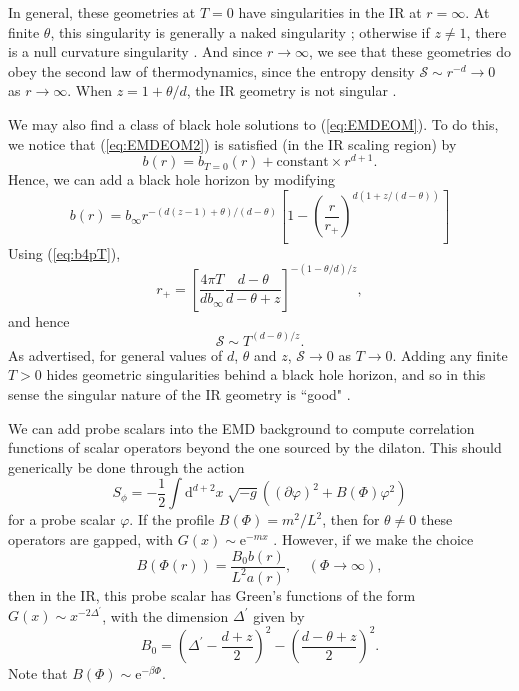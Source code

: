 \documentclass[10pt, oneside]{book}
\begin{document}
\begin{doublespace}
In general,  these geometries at $T=0$ have singularities in the IR at $r=\infty$.   At finite $\theta$, this singularity is generally a naked singularity \cite{Shaghoulian:2011aa};  otherwise if $z\ne 1$, there is a null curvature singularity \cite{Horowitz:2011gh}.    And since $r\rightarrow \infty$, we see that these geometries do obey the second law of thermodynamics, since the entropy density $\mathcal{S} \sim r^{-d}\rightarrow 0$ as $r\rightarrow\infty$.   When $z=1+\theta/d$, the IR geometry is not singular \cite{Shaghoulian:2011aa}.

We may also find a class of black hole solutions to (\ref{eq:EMDEOM}).   To do this, we notice that (\ref{eq:EMDEOM2}) is satisfied (in the IR scaling region) by \begin{equation}
b(r) = b_{T=0}(r) + \text{constant}\times r^{d+1}.
\end{equation}
Hence, we can add a black hole horizon by modifying \begin{equation}
b(r) = b_\infty r^{-(d(z-1)+\theta)/(d-\theta)} \left[1 - \left(\frac{r}{r_+}\right)^{d(1+z/(d-\theta))}\right]
\end{equation}
Using (\ref{eq:b4pT}),  \begin{equation}
r_+ = \left[\frac{4\pi T}{db_\infty} \frac{d-\theta}{d-\theta+z}\right]^{-(1-\theta/d)/z},  \label{eq:rPEMD}
\end{equation}
and hence \begin{equation}
\mathcal{S} \sim T^{(d-\theta)/z}.  \label{eq:Sthetaz}
\end{equation}
As advertised, for general values of $d$, $\theta$ and $z$, $\mathcal{S} \rightarrow 0$ as $T\rightarrow 0$.  Adding any finite $T>0$ hides geometric singularities behind a black hole horizon, and so in this sense the singular nature of the IR geometry is ``good" \cite{Gubser:2000nd}.   

We can add probe scalars into the EMD background to compute correlation functions of scalar operators beyond the one sourced by the dilaton.  This should generically be done through the action  \begin{equation}
S_\phi = -\frac{1}{2}\int \mathrm{d}^{d+2}x\; \sqrt{-g}\left((\partial \varphi)^2 + B(\Phi)\varphi^2\right)  \label{eq:4phi}
\end{equation}
for a probe scalar $\varphi$.   If the profile $B(\Phi) = m^2/L^2$,  then for $\theta \ne 0$ these operators are gapped, with $G(x)\sim \mathrm{e}^{-mx}$ \cite{Dong:2012se}.    However, if we make the choice \cite{lucas1401} \begin{equation}
B(\Phi(r)) = \frac{B_0 b(r)}{L^2a(r)},\;\;\;\; (\Phi \rightarrow \infty),
\end{equation}
then in the IR, this probe scalar has Green's functions of the form $G(x)\sim x^{-2\Delta^\prime}$, with the dimension $\Delta^\prime$ given by \begin{equation}
B_0 = \left(\Delta^\prime - \frac{d+z}{2}\right)^2 - \left(\frac{d-\theta+z}{2}\right)^2.
\end{equation}
Note that $B(\Phi) \sim \mathrm{e}^{-\beta \Phi}$.   


\end{doublespace}
\end{document}
